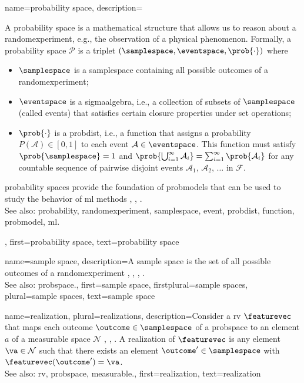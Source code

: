  {name={probability space}, 
 	description={A \gls{probability} space is a mathematical 
 		structure that allows us to reason about a \gls{randomexperiment}, e.g., 
		the observation of a physical phenomenon. 
 	   	Formally, a \gls{probability} space $\mathcal{P}$ is a triplet $(\samplespace, \eventspace, \prob{\cdot})$ where
 		\begin{itemize} 
 			\item  $\samplespace$ is a \gls{samplespace} containing all possible outcomes 
			of a \gls{randomexperiment};
 			\item  $\eventspace$ is a \gls{sigmaalgebra}, i.e., a collection of subsets of 
			$\samplespace$ (called \glspl{event}) that satisfies certain closure properties 
			under set operations;
 			\item $\prob{\cdot}$ is a \gls{probdist}, i.e., a \gls{function} that assigns 
			a \gls{probability} $P(\mathcal{A}) \in [0,1]$ to each \gls{event} $\mathcal{A} 
			\in \eventspace$. This \gls{function} must satisfy $\prob{\samplespace} = 1$ and 
			$\prob{\bigcup_{i=1}^{\infty} \mathcal{A}_i} = \sum_{i=1}^{\infty} \prob{\mathcal{A}_i}$ 
			for any \gls{countable} \gls{sequence} of pairwise disjoint \glspl{event} $\mathcal{A}_1, \,\mathcal{A}_2, \,\ldots$ in $\mathcal{F}$.
 		\end{itemize}
 		\Gls{probability} spaces provide the foundation of \glspl{probmodel} that can be 
		used to study the behavior of \gls{ml} methods \cite{BillingsleyProbMeasure}, \cite{GrayProbBook}, \cite{ross2013first}.
				\\
		See also: \gls{probability}, \gls{randomexperiment}, \gls{samplespace}, \gls{event}, \gls{probdist}, \gls{function}, \gls{probmodel}, \gls{ml}.},  
 	first={probability space}, 
 	text={probability space}
 }
 
 
  {name={sample space}, 
  	description={A \gls{sample} space is the set of all possible 
		outcomes of a \gls{randomexperiment} \cite{BillingsleyProbMeasure}, 
		\cite{BertsekasProb}, \cite{papoulis}, \cite{AshProbMeasure}. 
		\\
 		See also: \gls{probspace}.},  
  	first={sample space}, 
 	firstplural={sample spaces},
 	plural={sample spaces},
  	text={sample space}
  }
 
	
{name={realization}, plural={realizations},
	description={Consider a \gls{rv} $\featurevec$ that maps each outcome 
		$\outcome \in \samplespace$ of a \gls{probspace} to an element $a$ of a 
		\gls{measurable} space $\mathcal{N}$ \cite{RudinBookPrinciplesMatheAnalysis}, \cite{BillingsleyProbMeasure}, \cite{HalmosMeasure}. 
		A realization of $\featurevec$ is any element $\va \in \mathcal{N}$ such that there exists 
		an element $\outcome' \in \samplespace$ with $\featurevec(\outcome') = \va$.
			\\
		See also: \gls{rv}, \gls{probspace}, \gls{measurable}.}, 
	first={realization},
	text={realization}  
}

